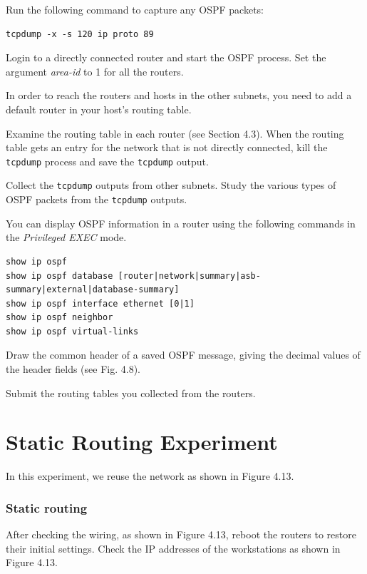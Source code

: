 \documentclass{../UTNetLab}
\begin{document}
    Run the following command to capture any OSPF packets: 
    \begin{lstlisting}
tcpdump -x -s 120 ip proto 89
    \end{lstlisting}

    Login to a directly connected router and start the OSPF process.
    Set the argument \textit{area-id} to 1 for all the routers. 

    In order to reach the routers and hosts in the other subnets, you need to add a default router in your host’s routing table. 

    Examine the routing table in each router (see Section 4.3).
    When the routing table gets an entry for the network that is not directly connected, kill the \lstinline{tcpdump} process and save the \lstinline{tcpdump} output. 

    Collect the \lstinline{tcpdump} outputs from other subnets.
    Study the various types of OSPF packets from the \lstinline{tcpdump} outputs. 

    You can display OSPF information in a router using the following commands in the \textit{Privileged EXEC} mode.
    \begin{lstlisting}[language={cisco}]
show ip ospf
show ip ospf database [router|network|summary|asb-summary|external|database-summary]
show ip ospf interface ethernet [0|1]
show ip ospf neighbor
show ip ospf virtual-links
    \end{lstlisting}
    
    \begin{report}
        \item Draw the common header of a saved OSPF message, giving the decimal values of the header fields (see Fig. 4.8).
        
        \item Submit the routing tables you collected from the routers.
    \end{report}

\part{Static Routing Experiment}
    In this experiment, we reuse the network as shown in Figure 4.13.
\section{Static routing}
    After checking the wiring, as shown in Figure 4.13, reboot the routers to restore their initial settings.
    Check the IP addresses of the workstations as shown in Figure 4.13. 
\end{document}

